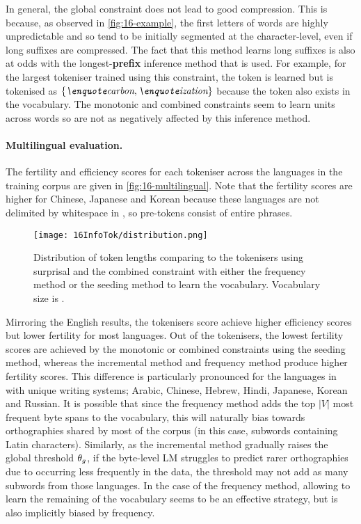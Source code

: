 In general, the global constraint does not lead to good compression. This is because, as observed in \cref{fig:16-example}, the first letters of words are highly unpredictable and so tend to be initially segmented at the character-level, even if long suffixes are compressed. The fact that this method learns long suffixes is also at odds with the longest-\textbf{prefix} inference method that is used. For example, for the largest tokeniser trained using this constraint, the token  is learned but  is tokenised as \(\{\ex{carbon},\ex{ization}\}\) because the token  also exists in the vocabulary. The monotonic and combined constraints seem to learn units across words so are not as negatively affected by this inference method.

\paragraph{Multilingual evaluation.}

The fertility and \renyi efficiency scores for each tokeniser across the  languages in the training corpus are given in \cref{fig:16-multilingual}. Note that the fertility scores are higher for Chinese, Japanese and Korean because these languages are not delimited by whitespace in \commoncorpus, so pre-tokens consist of entire phrases. 

\begin{figure}[!t]
    \centering
    \texttt{[image: 16InfoTok/distribution.png]}
    \caption{Distribution of token lengths comparing \bpewp to the \tokname tokenisers using surprisal and the combined constraint with either the frequency method or the seeding method to learn the vocabulary. Vocabulary size is .}
    \label{fig:16-distribution}
\end{figure}

Mirroring the English results, the \tokname tokenisers score achieve higher \renyi efficiency scores but lower fertility for most languages. Out of the \tokname tokenisers, the lowest fertility scores are achieved by the monotonic or combined constraints using the seeding method, whereas the incremental method and frequency method produce higher fertility scores. This difference is particularly pronounced for the languages in \commoncorpus with unique writing systems; Arabic, Chinese, Hebrew, Hindi, Japanese, Korean and Russian. It is possible that since the frequency method adds the top $|V|$ most frequent byte spans to the vocabulary, this will naturally bias towards orthographies shared by most of the corpus (in this case, subwords containing Latin characters). Similarly, as the incremental method gradually raises the global threshold $\theta_g$, if the byte-level LM struggles to predict rarer orthographies due to occurring less frequently in the data, the threshold may not add as many subwords from those languages. In the case of the frequency method, allowing \bpe to learn the remaining  of the vocabulary seems to be an effective strategy, but \bpe is also implicitly biased by frequency.

